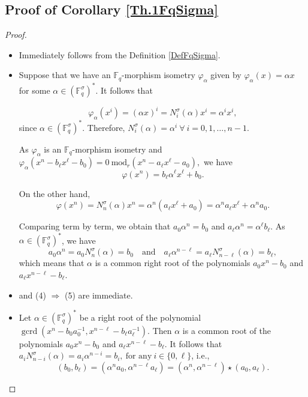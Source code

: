 \documentclass[12pt,paper]{article}
\theoremstyle{plain}
\newcommand{\Fq}{\mathbb{F}_{q}}
\DeclareMathOperator{\gcrd}{gcrd}
\begin{document}
 \subsection{Proof of Corollary \ref{Th.1FqSigma}}
 \begin{proof}\;
\begin{itemize}
    \item[(1) $\Rightarrow$ (2):] Immediately follows from the Definition \ref{DefFqSigma}.
 \item[(2) $\Rightarrow$ (3):] Suppose that we have an $\Fq$-morphism  isometry $\varphi_{\alpha}$ given by 
$\varphi_{\alpha}(x) = \alpha x$ for some $ \alpha \in (\mathbb{F}_q^{\sigma})^*$. It follows that

$$ 
\varphi_{\alpha}(x^i)= (\alpha x)^i= N_i^{\sigma}(\alpha) x^{ i} =\alpha^i x^i,$$
since  $\alpha \in (\mathbb{F}_q^{\sigma})^* $. Therefore, $ N_i^{\sigma}(\alpha)=\alpha^i\ \forall  \ i=0,1, \ldots, n-1.$

As $\varphi_{\alpha}$ is an $\Fq$-morphism isometry and  $ \varphi_{\alpha}(x^n-b_{\ell}x^{\ell}-b_0)=0 \ \text{mod}_r (x^n- a_{\ell} x^{\ell}-a_0) ,$ we have
\begin{equation}
\varphi( x^n)=   b_{\ell}  \alpha^{\ell} x^{\ell} +b_0.
 \end{equation}

On the other hand,
\begin{equation}
\varphi( x^n)=  N_n^{\sigma}(\alpha) x^n= \alpha^n ( a_{\ell}x^{\ell}+a_0) = \alpha^n  a_{\ell} x^{\ell}+ \alpha^n a_0.
\end{equation}


Comparing term by term, we obtain  that $ a_0 \alpha^n  = b_0   $ and $  a_{\ell} \alpha^n =  \alpha^{\ell} b_{\ell}. $ As $ \alpha \in (\mathbb{F}_q^{\sigma})^*$, we have 
$$ a_0 \alpha^n= a_0 N_n^{\sigma}(\alpha)   = b_0   \quad  \text{and} \quad   a_{\ell} \alpha^{n-\ell} = a_{\ell}N_{n-\ell}^{\sigma}(\alpha) =  b_{\ell}, $$
which means that $\alpha$ is a common right root of the polynomials $a_0 x^n - b_0$ and $a_{\ell} x^{n-\ell} - b_{\ell}$.

    \item[(3) $\Rightarrow$ (4)\;] and (4) $\Rightarrow$ (5) are immediate.
 \item[(5) $\Rightarrow$ (6):]
    Let $ \alpha \in (\mathbb{F}_q^{\sigma})^*$ be a right root of the polynomial $\gcrd(x^{n} - b_0 a_0^{-1}, x^{n-\ell} - b_{\ell} a_{\ell}^{-1})$. Then $\alpha$ is a common root of the polynomials $a_0 x^n - b_0$ and $a_{\ell} x^{n-\ell} - b_{\ell}$. It follows that  $a_i N^{\sigma}_{n-i}(\alpha)=a_i \alpha^{n-i} = b_i,\ \text{for any} \ i\in \{ 0,\ell\}$, i.e.,
$$  (b_0, b_{\ell} )= (\alpha^n a_0, \alpha^{n-\ell} a_{\ell})=(\alpha^n, \alpha^{n-\ell})\star(a_0, a_{\ell} ).$$ 


\end{itemize}
\end{proof}
\end{document}
